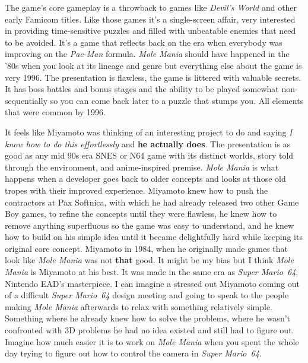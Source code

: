 \documentclass{book}
\begin{document}
The game’s core gameplay is a throwback to games like \emph{Devil’s World} and other early Famicom titles. Like those games it’s a single-screen affair, very interested in providing time-sensitive puzzles and filled with unbeatable enemies that need to be avoided. It’s a game that reflects back on the era when everybody was improving on the \emph{Pac-Man} formula. \emph{Mole Mania} should have happened in the ’80s when you look at its lineage and genre but everything else about the game is very 1996. The presentation is flawless, the game is littered with valuable secrets. It has boss battles and bonus stages and the ability to be played somewhat non-sequentially so you can come back later to a puzzle that stumps you. All elements that were common by 1996.

It feels like Miyamoto was thinking of an interesting project to do and saying \emph{I know how to do this effortlessly} and \textbf{he actually does}. The presentation is as good as any mid 90s era SNES or N64 game with its distinct worlds, story told through the environment, and anime-inspired premise. \emph{Mole Mania} is what happens when a developer goes back to older concepts and looks at those old tropes with their improved experience. Miyamoto knew how to push the contractors at Pax Softnica, with which he had already released two other Game Boy games, to refine the concepts until they were flawless, he knew how to remove anything superfluous so the game was easy to understand, and he knew how to build on his simple idea until it became delightfully hard while keeping its original core concept. Miyamoto in 1984, when he originally made games that look like \emph{Mole Mania} was not \textbf{that} good. It might be my bias but I think \emph{Mole Mania} is Miyamoto at his best. It was made in the same era as \emph{Super Mario 64}, Nintendo EAD’s masterpiece. I can imagine a stressed out Miyamoto coming out of a difficult \emph{Super Mario 64} design meeting and going to speak to the people making \emph{Mole Mania} afterwards to relax with something relatively simple. Something where he already knew how to solve the problems, where he wasn’t confronted with 3D problems he had no idea existed and still had to figure out. Imagine how much easier it is to work on \emph{Mole Mania} when you spent the whole day trying to figure out how to control the camera in \emph{Super Mario 64}.
\end{document}
